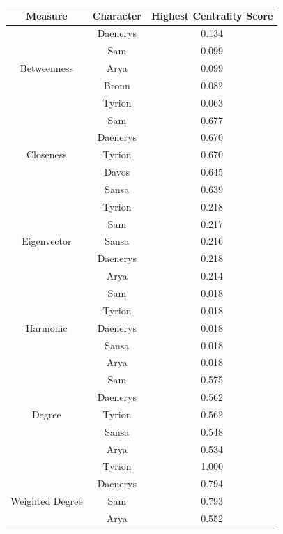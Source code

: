 \documentclass[10pt,twocolumn,letterpaper]{article}
\begin{document}
\begin{table}[!h]
    \centering
    \small
    \begin{tabular}{c|c|c}
        Measure & Character & \small{Highest Centrality Score} \\
        \hline
                    & Daenerys & 0.134 \\
                    & Sam & 0.099 \\
        Betweenness & Arya & 0.099 \\
                    & Bronn & 0.082 \\
                    & Tyrion & 0.063 \\
        \hline 
                    & Sam & 0.677 \\
                    & Daenerys & 0.670 \\
        Closeness   & Tyrion & 0.670 \\
                    & Davos & 0.645 \\
                    & Sansa & 0.639 \\
        \hline 
                    & Tyrion & 0.218 \\
                    & Sam & 0.217 \\
        Eigenvector & Sansa & 0.216 \\
                    & Daenerys & 0.218 \\
                    & Arya & 0.214 \\
        \hline 
                    & Sam & 0.018 \\
                    & Tyrion & 0.018 \\
        Harmonic    & Daenerys & 0.018 \\
                    & Sansa & 0.018 \\
                    & Arya & 0.018 \\
        \hline
                    & Sam & 0.575 \\
                    & Daenerys & 0.562 \\
        Degree      & Tyrion & 0.562 \\
                    & Sansa & 0.548 \\
                    & Arya & 0.534 \\
        \hline
                    & Tyrion & 1.000 \\
                    & Daenerys & 0.794 \\
        Weighted Degree & Sam & 0.793 \\
                    & Arya & 0.552 \\

\end{tabular}
\end{table}
\end{document}
